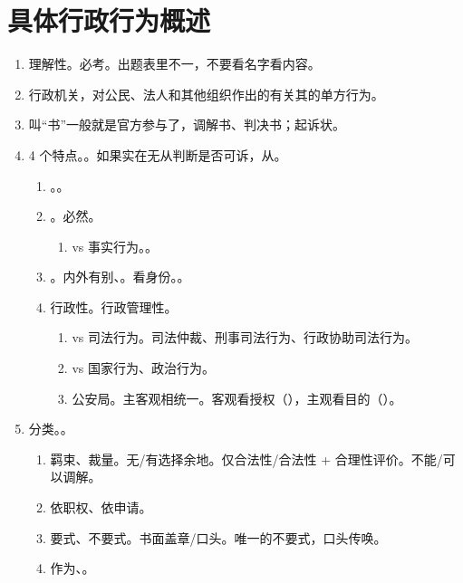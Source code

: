 \section{具体行政行为概述}
\begin{enumerate}
  \item 理解性。必考。出题表里不一，不要看名字看内容。
  \item 行政机关，对公民、法人和其他组织作出的有关其的单方行为。
  \item 叫“书”一般就是官方参与了，调解书、判决书；起诉状。
  \item 4 个特点。。如果实在无从判断是否可诉，从。
        \begin{enumerate}
          \item {}。。
          \item {}。必然。
                \begin{enumerate}
                  \item vs 事实行为。。
                \end{enumerate}
          \item {}。内外有别、。看身份。。
          \item 行政性。行政管理性。
                \begin{enumerate}
                  \item vs 司法行为。司法仲裁、刑事司法行为、行政协助司法行为。
                  \item vs 国家行为、政治行为。
                  \item 公安局。主客观相统一。客观看授权（），主观看目的（）。
                \end{enumerate}
        \end{enumerate}
  \item 分类。。
        \begin{enumerate}
          \item 羁束、裁量。无/有选择余地。仅合法性/合法性 + 合理性评价。不能/可以调解。
          \item 依职权、依申请。
          \item 要式、不要式。书面盖章/口头。唯一的不要式，口头传唤。
          \item 作为、。

\end{enumerate}
\end{enumerate}
